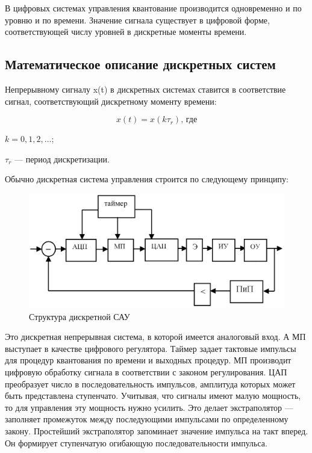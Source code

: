 \documentclass[unicode, 12pt, a4paper, oneside]{article}
\begin{document}
В цифровых системах управления квантование производится одновременно и по уровню и по времени. Значение сигнала существует в цифровой форме, соответствующей числу уровней в дискретные моменты времени. %

\subsection*{Математическое описание дискретных систем}

Непрерывному сигналу x(t) в дискретных системах ставится в соответствие сигнал, соответствующий дискретному моменту времени:

\begin{equation}
x(t) = x(k\tau_r) \text{, где}
\end{equation}
\par $ k = 0, 1, 2, \ldots $;\nopagebreak
\par $ \tau_r $ --- период дискретизации.

Обычно дискретная система управления строится по следующему принципу:

\begin{figure}[H]
\centering
\includegraphics[width=0.7\linewidth]{21_dicret_struct.png}
\caption{Структура дискретной САУ}
\label{fig:21_dicret_struct}
\end{figure}

Это дискретная непрерывная система, в которой имеется аналоговый вход. А МП выступает в качестве цифрового регулятора. Таймер задает тактовые импульсы для процедур квантования по времени и выходных процедур. МП производит цифровую обработку сигнала в соответствии с законом регулирования. ЦАП преобразует число в последовательность импульсов, амплитуда которых может быть представлена ступенчато. Учитывая, что сигналы имеют малую мощность, то для управления эту мощность нужно усилить. Это делает экстраполятор --- заполняет промежуток между последующими импульсами по определенному закону. Простейший экстраполятор запоминает значение импульса на такт вперед. Он формирует ступенчатую огибающую последовательности импульса.
\end{document}
